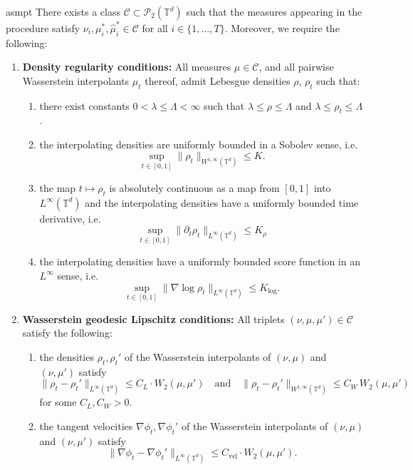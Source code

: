 \documentclass[11pt]{article}
\newcommand{\man}{M}
\begin{document}
\begin{restatable}[Uniform admissibility of the trajectory class, $\man = \mathbb{T}^d$]{asmpt}{} \label{all necessary W assumptions}
There exists a class $\mathcal C \subset \mathcal P_2(\mathbb{T}^d)$ such that the measures appearing in the procedure satisfy $\nu_i, \mu_i^*, \hat\mu_i^* \in \mathcal C$ for all $i\in\{1,\dots,T\}.$ Moreover, we require the following:

\begin{enumerate}[label=\textbf{(A.\arabic*)}, leftmargin=*, align=left]

\item \textbf{Density regularity conditions:} 
All measures $\mu \in \mathcal{C}$, and all pairwise Wasserstein interpolants $\mu_t$ thereof, admit Lebesgue densities $\rho$, $\rho_t$ such that: \label{density regularity conditions}
\begin{enumerate}[label=(\alph*)]
    \item there exist constants $0 < \lambda \leq \Lambda < \infty$ such that $\lambda \leq \rho\leq \Lambda$ and $\lambda \leq \rho_t \leq \Lambda$.
    \item the interpolating densities are uniformly bounded in a Sobolev sense, i.e. 
    \[\sup_{t \in [0,1]}\|\rho_t\|_{W^{1, \infty}(\mathbb{T}^d)} \leq K.\] 
    \item the map $t \mapsto \rho_t$ is absolutely continuous as a map from $[0,1]$ into $L^\infty(\mathbb{T}^d)$ and the interpolating densities have a uniformly bounded time derivative, i.e.
    \[\sup_{t \in [0,1]}\|\partial_t\rho_t\|_{L^{\infty}(\mathbb{T}^d)} \leq K_\rho\]
    \item the interpolating densities have a uniformly bounded score function in an $L^\infty$ sense, i.e.
    \[\sup_{t \in [0,1]}\|\nabla \log \rho_t\|_{L^\infty(\mathbb{T}^d)} \leq K_{\log}.\]
\end{enumerate}

\item \textbf{Wasserstein geodesic Lipschitz conditions:}  All triplets $(\nu, \mu, \mu') \in \mathcal{C}$ satisfy the following: \label{geodesic lipschitz conditions}
\begin{enumerate}[label=(\alph*)]
    \item the densities $\rho_t, \rho_t'$ of the Wasserstein interpolants of $(\nu, \mu)$ and $(\nu, \mu')$ satisfy
    \[\| \rho_t - \rho_t'\|_{L^\infty(\mathbb{T}^d)} \leq C_{L}\cdot W_2(\mu, \mu') \quad \text{and} \quad \|\rho_t-\rho_t'\|_{W^{1,\infty}(\mathbb{T}^d)}
    \le C_{W}\,W_2(\mu,\mu')\]
    for some $C_{L}, C_W > 0$. 
    \item the tangent velocities $\nabla \phi_t, \nabla \phi_t'$ of the Wasserstein interpolants of $(\nu, \mu)$ and $(\nu, \mu')$ satisfy
    \[\|\nabla \phi_t - \nabla \phi_t'\|_{L^\infty(\mathbb{T}^d)} \leq C_{\text{vel}}\cdot W_2(\mu, \mu').\]
\end{enumerate}


\end{enumerate}
\end{restatable}
\end{document}

